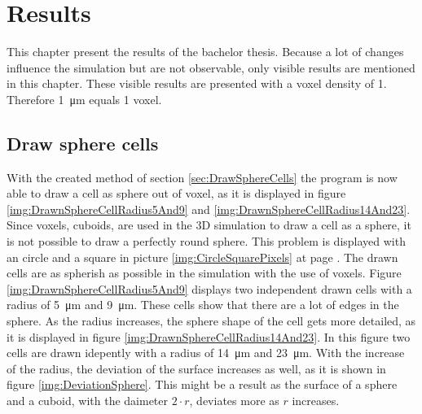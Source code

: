 \chapter{Results}
This chapter present the results of the bachelor thesis. Because a lot of changes influence the simulation but are not observable, only visible results are mentioned in this chapter. These visible results are presented with a voxel density of 1. Therefore \SI{1}{\micro\metre} equals 1 voxel.

\section{Draw sphere cells}
With the created method of section \ref{sec:DrawSphereCells} the program is now able to draw a cell as sphere out of
voxel, as it is displayed in figure \ref{img:DrawnSphereCellRadius5And9} and \ref{img:DrawnSphereCellRadius14And23}. \newline
Since voxels, cuboids, are used in the 3D simulation to draw a cell as a sphere, it is not possible to draw a perfectly round sphere. This problem is displayed with an circle and a square in picture \ref{img:CircleSquarePixels} at page \pageref{img:CircleSquarePixels}. The drawn cells are as spherish as possible in the simulation with the use of voxels. \newline
Figure \ref{img:DrawnSphereCellRadius5And9} displays two independent drawn cells with a radius of \SI{5}{\micro\metre} and \SI{9}{\micro\metre}. These cells show that there are a lot of edges in the sphere. As the radius increases, the sphere shape of the cell gets more detailed, as it is displayed in figure \ref{img:DrawnSphereCellRadius14And23}. In this figure two cells are drawn idepently with a radius of \SI{14}{\micro\metre} and \SI{23}{\micro\metre}. With the increase of the radius, the deviation of the surface increases as well, as it is shown in figure \ref{img:DeviationSphere}. This might be a result as the surface of a sphere and a cuboid, with the daimeter $2 \cdot r$, deviates more as $r$ increases.

